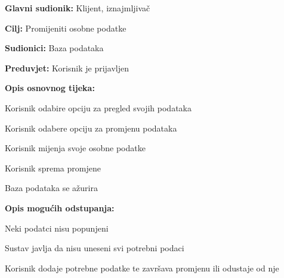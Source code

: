 						\noindent {}
					\begin{packed_item}
	
						\item \textbf{Glavni sudionik: }Klijent, iznajmljivač
						\item  \textbf{Cilj: }Promijeniti osobne podatke
						\item  \textbf{Sudionici: }Baza podataka
						\item  \textbf{Preduvjet: }Korisnik je prijavljen
						\item  \textbf{Opis osnovnog tijeka:}
						
						\item[] \begin{packed_enum}
	
							\item Korisnik odabire opciju za pregled svojih podataka
							\item Korisnik odabere opciju za promjenu podataka
							\item Korisnik mijenja svoje osobne podatke
							\item Korisnik sprema promjene
							\item Baza podataka se ažurira


						\end{packed_enum}
						
						\item  \textbf{Opis mogućih odstupanja:}
						
						\item[] \begin{packed_item}
	
							\item[3.a] Neki podatci nisu popunjeni
							\item[] \begin{packed_enum}
								
								\item Sustav javlja da nisu uneseni svi potrebni podaci
								\item Korisnik dodaje potrebne podatke te završava promjenu ili odustaje od nje
								
							\end{packed_enum}
							
						\end{packed_item}						
					\end{packed_item}	


